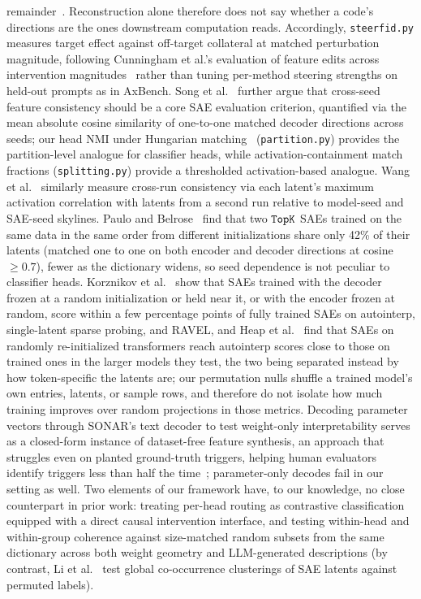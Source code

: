 remainder~\cite[Sec.~3.1]{gurnee2026verbalizable}. Reconstruction alone
therefore does not say whether a code's directions are the ones downstream
computation reads. Accordingly, \texttt{steerfid.py}
measures target effect against off-target collateral at matched
perturbation magnitude, following Cunningham et al.'s evaluation of
feature edits across intervention magnitudes~\cite{cunningham2023} rather
than tuning per-method steering strengths on held-out prompts as in
AxBench. Song et
al.~\cite{song2025positionmechanisticinterpretabilityprioritize} further
argue that cross-seed feature consistency should be a core SAE evaluation
criterion, quantified via the mean absolute cosine similarity of
one-to-one matched decoder directions across seeds; our head NMI under
Hungarian matching~\cite{kuhn1955} (\texttt{partition.py}) provides the
partition-level analogue
for classifier heads, while activation-containment match fractions
(\texttt{splitting.py}) provide a thresholded activation-based analogue.
Wang et al.~\cite{wang2024} similarly measure cross-run consistency via
each latent's maximum activation correlation with latents from a second
run relative to model-seed and SAE-seed skylines. Paulo and
Belrose~\cite{paulo2025seeds} find that two $\mathop{\mathtt{TopK}}\limits$ SAEs trained on the
same data in the same order from different initializations share only
42\% of their latents (matched one to one on both encoder and decoder
directions at cosine $\ge 0.7$), fewer as the dictionary widens, so seed
dependence is not peculiar to classifier heads. Korznikov et
al.~\cite{korznikov2026} show that SAEs trained with the decoder frozen
at a random initialization or held near it, or with the encoder frozen at
random, score within a few percentage
points of fully trained SAEs on autointerp, single-latent sparse probing,
and RAVEL, and Heap et al.~\cite{heap2025} find that SAEs on randomly
re-initialized transformers reach autointerp scores close to those on
trained ones in the larger models they test, the two being separated
instead by how token-specific the latents are; our permutation nulls shuffle a trained model's own entries,
latents, or sample rows, and therefore do not isolate how much training
improves over random projections in those metrics. Decoding parameter
vectors through SONAR's text decoder to test weight-only interpretability
serves as a closed-form instance of dataset-free feature synthesis, an
approach that struggles even on planted ground-truth triggers, helping
human evaluators identify triggers less than half the
time~\cite{casper2023}; parameter-only decodes fail in our setting as
well. Two elements of our framework have, to our knowledge, no close
counterpart in prior work: treating per-head routing as contrastive classification equipped
with a direct causal intervention interface, and testing within-head and
within-group coherence against size-matched random subsets from the same
dictionary across both weight geometry and LLM-generated descriptions (by
contrast, Li et al.~\cite{li2024geometry} test global co-occurrence
clusterings of SAE latents against permuted labels).

